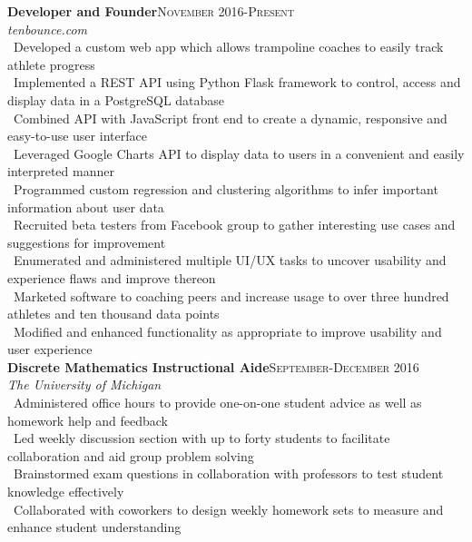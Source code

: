\documentclass[a4paper,10pt]{article}
\renewcommand{\subsection}[2]{{\noindent \textbf{#1}\hfill \textsc{#2}\\}}
\begin{document}
\subsection{Developer and Founder}{November 2016-Present}
\textit{tenbounce.com}\\
\textbullet\ Developed a custom web app which allows trampoline coaches to easily track athlete progress\\
\textbullet\ Implemented a REST API using Python Flask framework to control, access and display data in a PostgreSQL database\\
\textbullet\ Combined API with JavaScript front end to create a dynamic, responsive and easy-to-use user interface\\
\textbullet\ Leveraged Google Charts API to display data to users in a convenient and easily interpreted manner\\
\textbullet\ Programmed custom regression and clustering algorithms to infer important information about user data\\
\textbullet\ Recruited beta testers from Facebook group to gather interesting use cases and suggestions for improvement\\
\textbullet\ Enumerated and administered multiple UI/UX tasks to uncover usability and experience flaws and improve thereon\\
\textbullet\ Marketed software to coaching peers and increase usage to over three hundred athletes and ten thousand data points\\
\textbullet\ Modified and enhanced functionality as appropriate to improve usability and user experience\\

\subsection{Discrete Mathematics Instructional Aide}{September-December 2016}
\textit{The University of Michigan}\\
\textbullet\ Administered office hours to provide one-on-one student advice
 as well as homework help and feedback\\
\textbullet\ Led weekly discussion section with up to forty students to facilitate
 collaboration and aid group problem solving\\
\textbullet\ Brainstormed exam questions in collaboration with professors to test student knowledge effectively\\
\textbullet\ Collaborated with coworkers to design weekly homework sets to measure and enhance student understanding\\
\end{document}
